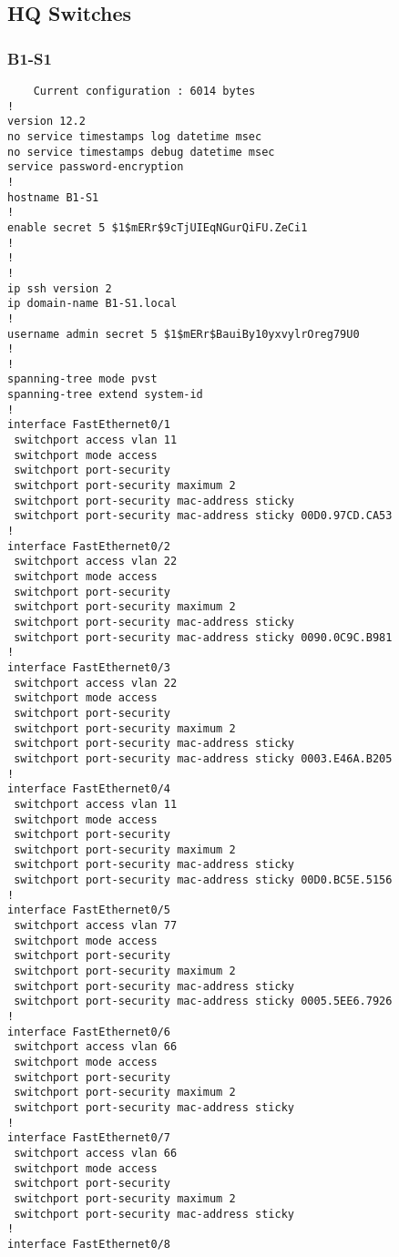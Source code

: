 \clearpage
\subsection{HQ Switches}
\subsubsection{B1-S1}\label{app:B1-S1}
\begin{verbatim}
    Current configuration : 6014 bytes
!
version 12.2
no service timestamps log datetime msec
no service timestamps debug datetime msec
service password-encryption
!
hostname B1-S1
!
enable secret 5 $1$mERr$9cTjUIEqNGurQiFU.ZeCi1
!
!
!
ip ssh version 2
ip domain-name B1-S1.local
!
username admin secret 5 $1$mERr$BauiBy10yxvylrOreg79U0
!
!
spanning-tree mode pvst
spanning-tree extend system-id
!
interface FastEthernet0/1
 switchport access vlan 11
 switchport mode access
 switchport port-security
 switchport port-security maximum 2
 switchport port-security mac-address sticky 
 switchport port-security mac-address sticky 00D0.97CD.CA53
!
interface FastEthernet0/2
 switchport access vlan 22
 switchport mode access
 switchport port-security
 switchport port-security maximum 2
 switchport port-security mac-address sticky 
 switchport port-security mac-address sticky 0090.0C9C.B981
!
interface FastEthernet0/3
 switchport access vlan 22
 switchport mode access
 switchport port-security
 switchport port-security maximum 2
 switchport port-security mac-address sticky 
 switchport port-security mac-address sticky 0003.E46A.B205
!
interface FastEthernet0/4
 switchport access vlan 11
 switchport mode access
 switchport port-security
 switchport port-security maximum 2
 switchport port-security mac-address sticky 
 switchport port-security mac-address sticky 00D0.BC5E.5156
!
interface FastEthernet0/5
 switchport access vlan 77
 switchport mode access
 switchport port-security
 switchport port-security maximum 2
 switchport port-security mac-address sticky 
 switchport port-security mac-address sticky 0005.5EE6.7926
!
interface FastEthernet0/6
 switchport access vlan 66
 switchport mode access
 switchport port-security
 switchport port-security maximum 2
 switchport port-security mac-address sticky 
!
interface FastEthernet0/7
 switchport access vlan 66
 switchport mode access
 switchport port-security
 switchport port-security maximum 2
 switchport port-security mac-address sticky 
!
interface FastEthernet0/8

\end{verbatim}
